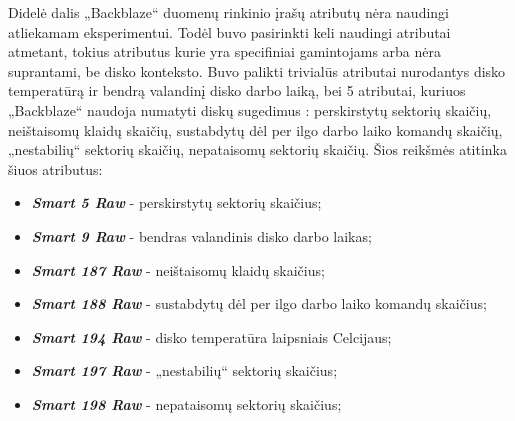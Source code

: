 \documentclass{VUMIFPSkursinis}
\begin{document}
Didelė dalis „Backblaze“ duomenų rinkinio įrašų atributų nėra naudingi atliekamam eksperimentui. Todėl buvo pasirinkti keli naudingi atributai atmetant, tokius atributus kurie yra specifiniai gamintojams arba nėra suprantami, be disko konteksto. Buvo palikti trivialūs atributai nurodantys disko temperatūrą ir bendrą valandinį disko darbo laiką, bei 5 atributai, kuriuos „Backblaze“ naudoja numatyti diskų sugedimus \cite{backblaze_failure}: perskirstytų sektorių skaičių, neištaisomų klaidų skaičių, sustabdytų dėl per ilgo darbo laiko komandų skaičių, „nestabilių“ sektorių skaičių, nepataisomų sektorių skaičių. Šios reikšmės atitinka šiuos atributus:
\begin{itemize}
\item \textit{\textbf{Smart 5 Raw}} - perskirstytų sektorių skaičius;
\item \textit{\textbf{Smart 9 Raw}} - bendras valandinis disko darbo laikas;
\item \textit{\textbf{Smart 187 Raw}} - neištaisomų klaidų skaičius;
\item \textit{\textbf{Smart 188 Raw}} - sustabdytų dėl per ilgo darbo laiko komandų skaičius;
\item \textit{\textbf{Smart 194 Raw}} - disko temperatūra laipsniais Celcijaus;
\item \textit{\textbf{Smart 197 Raw}} - „nestabilių“ sektorių skaičius;
\item \textit{\textbf{Smart 198 Raw}} - nepataisomų sektorių skaičius;
\end{itemize}
\end{document}
